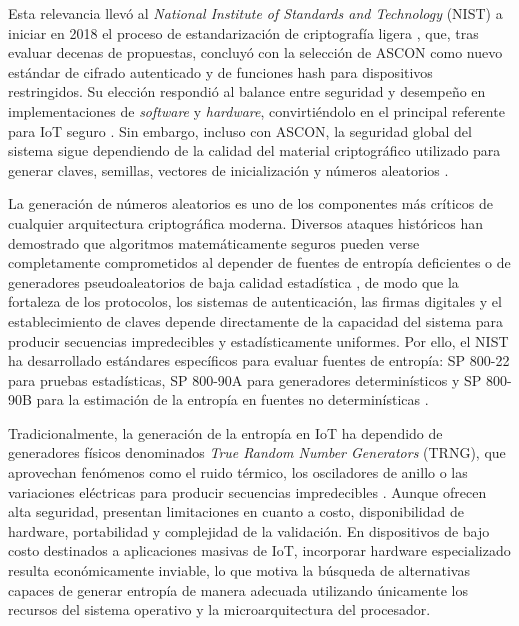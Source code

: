 Esta relevancia llevó al \textit{National Institute of Standards and Technology} (NIST) a iniciar en 2018 el proceso de estandarización de criptografía ligera \cite{McKay2017ReportCryptography}, que, tras evaluar decenas de propuestas, concluyó con la selección de ASCON como nuevo estándar de cifrado autenticado y de funciones hash para dispositivos restringidos\cite{NationalInstituteofStandards2023AnnouncingSelection,Turan2025Ascon-BasedFunctions}. Su elección respondió al balance entre seguridad y desempeño en implementaciones de \textit{software} y \textit{hardware}, convirtiéndolo en el principal referente para IoT seguro \cite{Dobraunig2021AsconHashing}. Sin embargo, incluso con ASCON, la seguridad global del sistema sigue dependiendo de la calidad del material criptográfico utilizado para generar claves, semillas, vectores de inicialización y números aleatorios \cite{Katz2020IntroductionCryptography}.

La generación de números aleatorios es uno de los componentes más críticos de cualquier arquitectura criptográfica moderna. Diversos ataques históricos han demostrado que algoritmos matemáticamente seguros pueden verse completamente comprometidos al depender de fuentes de entropía deficientes o de generadores pseudoaleatorios de baja calidad estadística \cite{Katz2020IntroductionCryptography,Menezes1996HandbookCryptography}, de modo que la fortaleza de los protocolos, los sistemas de autenticación, las firmas digitales y el establecimiento de claves depende directamente de la capacidad del sistema para producir secuencias impredecibles y estadísticamente uniformes. Por ello, el NIST ha desarrollado estándares específicos para evaluar fuentes de entropía: SP 800-22 para pruebas estadísticas, SP 800-90A para generadores determinísticos y SP 800-90B para la estimación de la entropía en fuentes no determinísticas \cite{Rukhin2010AApplications,Barker2015RecommendationGenerators,Turan2018RecommendationGeneration}.

Tradicionalmente, la generación de la entropía en IoT ha dependido de generadores físicos denominados \textit{True Random Number Generators} (TRNG), que aprovechan fenómenos como el ruido térmico, los osciladores de anillo o las variaciones eléctricas para producir secuencias impredecibles \cite{Seyhan2022ClassificationTaxonomy}. Aunque ofrecen alta seguridad, presentan limitaciones en cuanto a costo, disponibilidad de hardware, portabilidad y complejidad de la validación. En dispositivos de bajo costo destinados a aplicaciones masivas de IoT, incorporar hardware especializado resulta económicamente inviable, lo que motiva la búsqueda de alternativas capaces de generar entropía de manera adecuada utilizando únicamente los recursos del sistema operativo y la microarquitectura del procesador.

